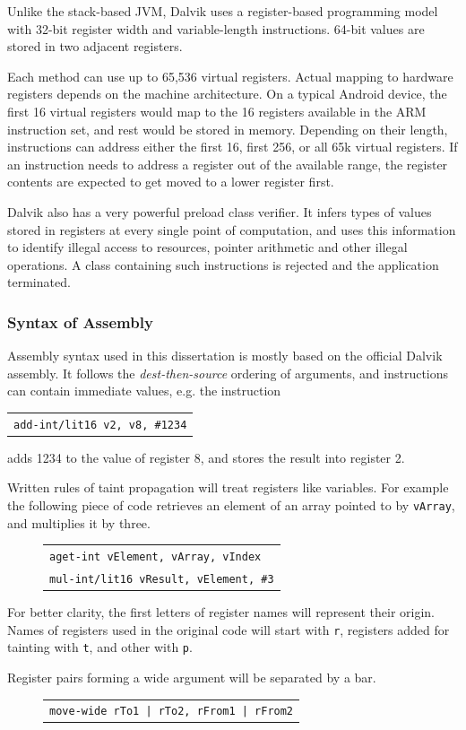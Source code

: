 \documentclass[12pt,twoside,notitlepage]{report}
\newcommand{\centerbox}[1] {
	\begin{center}
	\begin{footnotesize}
	\begin{tabular}{l}
		#1
	\end{tabular}
	\end{footnotesize}
	\end{center}
}
\newcommand{\asm}[1] {\texttt{#1}}
\begin{document}
Unlike the stack-based JVM, Dalvik uses a register-based programming model with 32-bit register width and variable-length instructions. 64-bit values are stored in two adjacent registers.

Each method can use up to 65,536 virtual registers. Actual mapping to hardware registers depends on the machine architecture. On a typical Android device, the first 16 virtual registers would map to the 16 registers available in the ARM instruction set, and rest would be stored in memory. Depending on their length, instructions can address either the first 16, first 256, or all 65k virtual registers. If an instruction needs to address a register out of the available range, the register contents are expected to get moved to a lower register first.

Dalvik also has a very powerful preload class verifier. It infers types of values stored in registers at every single point of computation, and uses this information to identify illegal access to resources, pointer arithmetic and other illegal operations. A class containing such instructions is rejected and the application terminated.

\subsubsection{Syntax of Assembly}
Assembly syntax used in this dissertation is mostly based on the official Dalvik assembly. It follows the \emph{dest-then-source} ordering of arguments, and instructions can contain immediate values, e.g. the instruction
		\centerbox{
			\asm{add-int/lit16 v2, v8, \#1234}
		}
adds 1234 to the value of register 8, and stores the result into register 2. 

Written rules of taint propagation will treat registers like variables. For example the following piece of code retrieves an element of an array pointed to by \verb$vArray$, and multiplies it by three.
	\begin{figure}[H]
		\centerbox{
			\asm{aget-int vElement, vArray, vIndex} \\
			\asm{mul-int/lit16 vResult, vElement, \#3}
		}
	\end{figure}

For better clarity, the first letters of register names will represent their origin. Names of registers used in the original code will start with \verb$r$, registers added for tainting with \verb$t$, and other with \verb$p$.

Register pairs forming a wide argument will be separated by a bar.
	\begin{figure}[H]
		\centerbox{
			\asm{move-wide rTo1 | rTo2, rFrom1 | rFrom2}
		}
	\end{figure}
\end{document}
